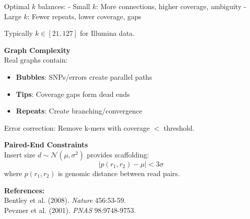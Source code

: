 \begin{technical}
Optimal $k$ balances:
- Small $k$: More connections, higher coverage, ambiguity
- Large $k$: Fewer repeats, lower coverage, gaps

Typically $k \in [21, 127]$ for Illumina data.

\textbf{Graph Complexity}\\[0.5em]
Real graphs contain:
\begin{itemize}[leftmargin=*, topsep=0pt, itemsep=0pt]
\item \textbf{Bubbles}: SNPs/errors create parallel paths
\item \textbf{Tips}: Coverage gaps form dead ends
\item \textbf{Repeats}: Create branching/convergence
\end{itemize}

Error correction: Remove k-mers with coverage $<$ threshold.

\textbf{Paired-End Constraints}\\[0.5em]
Insert size $d \sim \mathcal{N}(\mu, \sigma^2)$ provides scaffolding:
\[|p(r_1, r_2) - \mu| < 3\sigma\]
where $p(r_1, r_2)$ is genomic distance between read pairs.

\vspace{0.5em}
\textbf{References:}\\
Bentley et al. (2008). \textit{Nature} 456:53-59.\\
Pevzner et al. (2001). \textit{PNAS} 98:9748-9753.
\end{technical}
